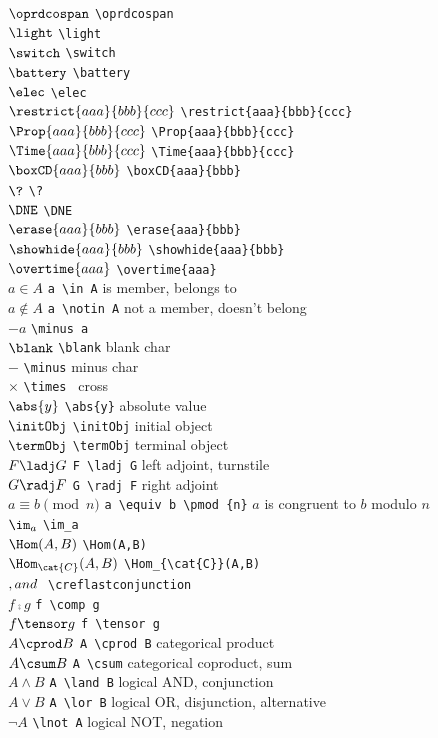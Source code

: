 \documentclass[11pt, book]{memoir}
\newcommand{\creflastconjunction}{, and\nobreakspace} %
\begin{document}
\begin{multicols}{2}
$\oprdcospan$ \verb|\oprdcospan| \\
$\light$ \verb|\light| \\
$\switch$ \verb|\switch| \\
$\battery$ \verb|\battery| \\
$\elec$ \verb|\elec| \\
$\restrict{aaa}{bbb}{ccc}$ \verb|\restrict{aaa}{bbb}{ccc}| \\
$\Prop{aaa}{bbb}{ccc}$ \verb|\Prop{aaa}{bbb}{ccc}| \\
$\Time{aaa}{bbb}{ccc}$ \verb|\Time{aaa}{bbb}{ccc}| \\
$\boxCD{aaa}{bbb}$ \verb|\boxCD{aaa}{bbb}| \\
$\?$ \verb|\?| \\
$\DNE$ \verb|\DNE| \\
$\erase{aaa}{bbb}$ \verb|\erase{aaa}{bbb}| \\
$\showhide{aaa}{bbb}$ \verb|\showhide{aaa}{bbb}| \\
$\overtime{aaa}$ \verb|\overtime{aaa}| \\
$a \in A$ \verb|a \in A| is member, belongs to \\
$a \notin A$ \verb|a \notin A| not a member, doesn't belong \\
$\minus a$ \verb|\minus a| \\
$\blank$ \verb|\blank| blank char \\
$\minus$ \verb|\minus| minus char \\
$\times $ \verb|\times | cross \\
$\abs{y}$ \verb|\abs{y}| absolute value \\
$\initObj$ \verb|\initObj| initial object \\
$\termObj$ \verb|\termObj| terminal object \\
$F \ladj G$ \verb|F \ladj G| left adjoint, turnstile \\
$G \radj F$ \verb|G \radj F| right adjoint \\
$a \equiv b \pmod {n}$ \verb|a \equiv b \pmod {n}| $a$ is congruent to $b$ modulo $n$ \\
$\im_a$ \verb|\im_a| \\
$\Hom(A,B)$ \verb|\Hom(A,B)| \\
$\Hom_{\cat{C}}(A,B)$ \verb|\Hom_{\cat{C}}(A,B)| \\
$\creflastconjunction$ \verb|\creflastconjunction| \\
$f \comp g$ \verb|f \comp g| \\
$f \tensor g$ \verb|f \tensor g| \\
$A \cprod B$ \verb|A \cprod B| categorical product \\
$A \csum B$ \verb|A \csum| categorical coproduct, sum \\
$A \land B$ \verb|A \land B| logical AND, conjunction \\
$A \lor B$ \verb|A \lor B| logical OR, disjunction, alternative \\
$\lnot A$ \verb|\lnot A| logical NOT, negation \\


\end{multicols}
\end{document}
